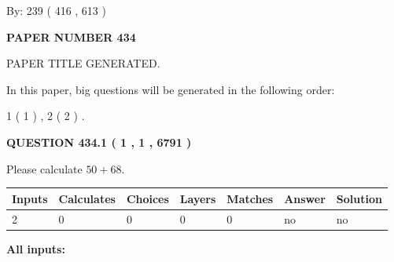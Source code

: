 \documentclass[12pt]{article}
\begin{document}
   
\hspace{1.0in} By: 
 239 ( 416 ,  613 )
   
   
   
   
\newpage 
\setcounter{page}{ 
   434001 } 
   
   
   
   
 {\textbf{ \Large{ PAPER NUMBER  434  }}}
   
   
\vspace{0.2in}
   
   
   
   
   
   
   
   
 \vspace{0.2in}
 
 
 
 
   
   
 PAPER TITLE GENERATED.
   
   
   
\vspace{0.2in}
   
In this paper, big questions will be generated in the following order: 
   
   
   1 ( 1 )
 ,
   2 ( 2 )
 .
  
\vspace{0.2in}
  
{\textbf{\Large{QUESTION
434.1 
 ( 1 , 1 , 6791 )
}}}
  
  
 
Please calculate $ %
50 +  %
68 $.
 
 
   
   
   
   
\noindent\begin{tabular}{|l|l|l|l|l|l|l|}
 \hline
Inputs & Calculates & Choices & Layers & Matches & Answer & Solution \\ \hline
 2  & 
 0  & 
 0
  & 
 0  & 
 0  & 
  no & 
  no 
  \\ \hline
 \end{tabular}
   
   
   
   
\noindent{}
   
   
   
   
\noindent\vspace{0.1in}\hspace{-0.08in} {\textbf{\Large{All inputs: }}}
   
\end{document}
